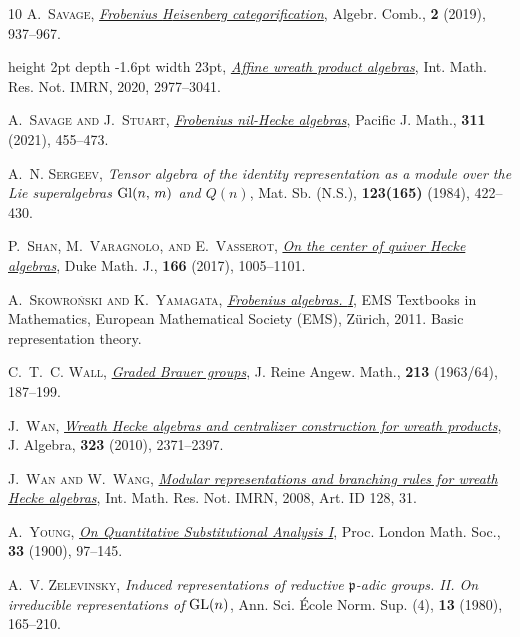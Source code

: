 \documentclass[a4paper,11pt]{amsart}
\numberwithin{equation}{subsection}
\theoremstyle{definition}
\theoremstyle{theorem}
\theoremstyle{remark}
\begin{document}
\begin{thebibliography}{10}
\textsc{A.~Savage}, \href{http://dx.doi.org/10.5802/alco.73}{\textit{Frobenius
  {H}eisenberg categorification}}, Algebr. Comb., \textbf{2} (2019), 937--967.

\leavevmode\vrule height 2pt depth -1.6pt width 23pt,
  \href{http://dx.doi.org/10.1093/imrn/rny092}{\textit{Affine wreath product
  algebras}}, Int. Math. Res. Not. IMRN, 2020, 2977--3041.

\textsc{A.~Savage and J.~Stuart},
  \href{http://dx.doi.org/10.2140/pjm.2021.311.455}{\textit{Frobenius
  nil-{H}ecke algebras}}, Pacific J. Math., \textbf{311} (2021), 455--473.

\textsc{A.~N. Sergeev}, \textit{Tensor algebra of the identity representation
  as a module over the {L}ie superalgebras {${\rm Gl}(n,\,m)$} and {$Q(n)$}},
  Mat. Sb. (N.S.), \textbf{123(165)} (1984), 422--430.

\textsc{P.~Shan, M.~Varagnolo, and E.~Vasserot},
  \href{http://dx.doi.org/10.1215/00127094-3792705}{\textit{On the center of
  quiver {H}ecke algebras}}, Duke Math. J., \textbf{166} (2017), 1005--1101.

\textsc{A.~Skowro\'{n}ski and K.~Yamagata},
  \href{http://dx.doi.org/10.4171/102}{\textit{Frobenius algebras. {I}}}, EMS
  Textbooks in Mathematics, European Mathematical Society (EMS), Z\"{u}rich,
  2011.
\newblock Basic representation theory.

\textsc{C.~T.~C. Wall},
  \href{http://dx.doi.org/10.1515/crll.1964.213.187}{\textit{Graded {B}rauer
  groups}}, J. Reine Angew. Math., \textbf{213} (1963/64), 187--199.

\textsc{J.~Wan},
  \href{http://dx.doi.org/10.1016/j.jalgebra.2010.02.020}{\textit{Wreath
  {H}ecke algebras and centralizer construction for wreath products}}, J.
  Algebra, \textbf{323} (2010), 2371--2397.

\textsc{J.~Wan and W.~Wang},
  \href{http://dx.doi.org/10.1093/imrn/rnn128}{\textit{Modular representations
  and branching rules for wreath {H}ecke algebras}}, Int. Math. Res. Not. IMRN,
  2008, Art. ID 128, 31.

\textsc{A.~Young}, \href{http://dx.doi.org/10.1112/plms/s1-33.1.97}{\textit{On
  Quantitative Substitutional Analysis {I}}}, Proc. London Math. Soc.,
  \textbf{33} (1900), 97--145.

\textsc{A.~V. Zelevinsky}, \textit{Induced representations of reductive
  {${\mathfrak p}$}-adic groups. {II}. {O}n irreducible representations of
  {${\rm GL}(n)$}}, Ann. Sci. \'Ecole Norm. Sup. (4), \textbf{13} (1980),
  165--210.

\end{thebibliography}
\end{document}
